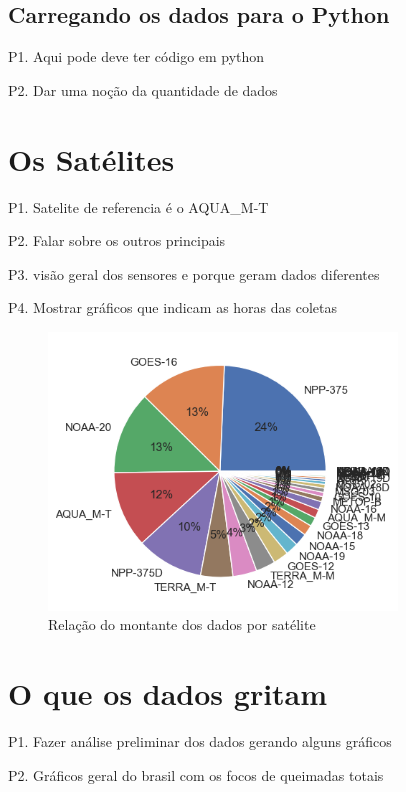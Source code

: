 \documentclass[cic,tc]{iiufrgs}
\begin{document}
\subsection{Carregando os dados para o Python} 

P1. Aqui pode deve ter código em python \par
P2. Dar uma noção da quantidade de dados \par

\section{Os Satélites}

P1. Satelite de referencia é o AQUA\_M-T \citep{PerguntasFrequentesINPE} \par
P2. Falar sobre os outros principais \par
P3. visão geral dos sensores e porque geram dados diferentes \par
P4. Mostrar gráficos que indicam as horas das coletas

\begin{figure}
    \caption{Relação do montante dos dados por satélite}
    \begin{center}
        \includegraphics[width=25em]{porcentagem_satelites}
    \end{center}
    \label{fig:porcentagem_satelites}
\end{figure}

\section{O que os dados gritam}

P1. Fazer análise preliminar dos dados gerando alguns gráficos \par
P2. Gráficos geral do brasil com os focos de queimadas totais \cite{geographicDataSciencePython} \par
\end{document}
